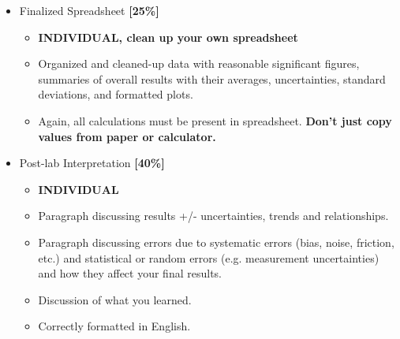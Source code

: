 \begin{itemize}
    \begin{itemize}
        \item Finalized Spreadsheet \textbf{[25\%]}
        \begin{itemize}
            \item  \textbf{INDIVIDUAL, clean up your own spreadsheet}
            \item Organized and cleaned-up data with reasonable significant figures, summaries of overall results with their averages, uncertainties, standard deviations, and formatted plots.
            \item Again, all calculations must be present in spreadsheet. \textbf{Don't just copy values from paper or calculator.}
        \end{itemize}
        \item Post-lab Interpretation \textbf{[40\%]}
        \begin{itemize}
            \item \textbf{INDIVIDUAL}
            \item Paragraph discussing results +/- uncertainties, trends and relationships.
            \item Paragraph discussing errors due to systematic errors (bias, noise, friction, etc.) and statistical or random errors (e.g. measurement uncertainties) and how they affect your final results. 
            \item Discussion of what you learned.
            \item Correctly formatted in English.
        \end{itemize}
    \end{itemize}
%        
%        


\end{itemize}
